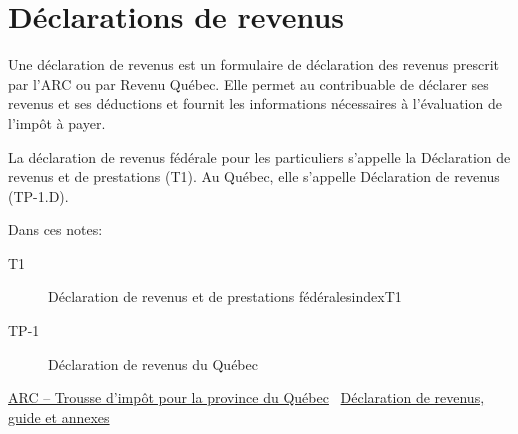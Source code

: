 \section{Déclarations de revenus}
\begin{intro}
	Une déclaration de revenus est un formulaire de déclaration des revenus prescrit par l'ARC ou par Revenu Québec. Elle permet au contribuable de déclarer ses revenus et ses déductions et fournit les informations nécessaires à l'évaluation de l'impôt à payer. 
	
	La déclaration de revenus fédérale pour les particuliers s'appelle la Déclaration de revenus et de prestations (T1). Au Québec, elle s'appelle Déclaration de revenus (TP-1.D).
\end{intro}
\begin{note}
	Dans ces notes:
	\begin{description}
		\item[T1] Déclaration de revenus et de prestations fédéralesindex{T1}
\		\item[TP-1] Déclaration de revenus du Québec
	\end{description}
\end{note}
\cat\href{https://www.canada.ca/fr/agence-revenu/services/formulaires-publications/trousses-impot-toutes-annees-imposition/trousse-generale-impot-prestations/quebec.html}{ARC -- Trousse d'impôt pour la province du Québec}
\
\qct\href{https://www.revenuquebec.ca/fr/services-en-ligne/formulaires-et-publications/details-courant/tp-1/}{Déclaration de revenus, guide et annexes}



